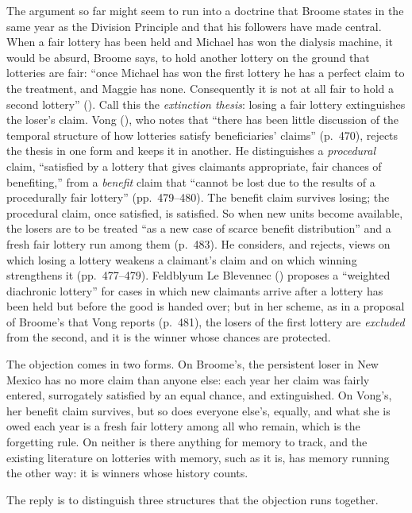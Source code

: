 \documentclass[
  11pt,
  letterpaper,
  DIV=11,
  numbers=noendperiod,
  twoside]{scrartcl}
\newcounter{none} %
\begin{document}
The argument so far might seem to run into a doctrine that Broome states
in the same year as the Division Principle and that his followers have
made central. When a fair lottery has been held and Michael has won the
dialysis machine, it would be absurd, Broome says, to hold another
lottery on the ground that lotteries are fair: ``once Michael has won
the first lottery he has a perfect claim to the treatment, and Maggie
has none. Consequently it is not at all fair to hold a second lottery''
(). Call this the
\emph{extinction thesis}: losing a fair lottery extinguishes the loser's
claim. Vong (), who notes that ``there has
been little discussion of the temporal structure of how lotteries
satisfy beneficiaries' claims'' (p.~470), rejects the thesis in one form
and keeps it in another. He distinguishes a \emph{procedural} claim,
``satisfied by a lottery that gives claimants appropriate, fair chances
of benefiting,'' from a \emph{benefit} claim that ``cannot be lost due
to the results of a procedurally fair lottery'' (pp.~479--480). The
benefit claim survives losing; the procedural claim, once satisfied, is
satisfied. So when new units become available, the losers are to be
treated ``as a new case of scarce benefit distribution'' and a fresh
fair lottery run among them (p.~483). He considers, and rejects, views
on which losing a lottery weakens a claimant's claim and on which
winning strengthens it (pp.~477--479). Feldblyum Le Blevennec
() proposes a ``weighted
diachronic lottery'' for cases in which new claimants arrive after a
lottery has been held but before the good is handed over; but in her
scheme, as in a proposal of Broome's that Vong reports (p.~481), the
losers of the first lottery are \emph{excluded} from the second, and it
is the winner whose chances are protected.

The objection comes in two forms. On Broome's, the persistent loser in
New Mexico has no more claim than anyone else: each year her claim was
fairly entered, surrogately satisfied by an equal chance, and
extinguished. On Vong's, her benefit claim survives, but so does
everyone else's, equally, and what she is owed each year is a fresh fair
lottery among all who remain, which is the forgetting rule. On neither
is there anything for memory to track, and the existing literature on
lotteries with memory, such as it is, has memory running the other way:
it is winners whose history counts.

The reply is to distinguish three structures that the objection runs
together.
\end{document}
